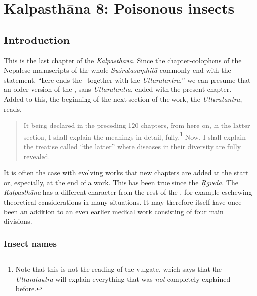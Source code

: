 \chapter{Kalpasthāna 8: Poisonous insects}

\section{Introduction} 

This is the last chapter of the \emph{Kalpasthāna}.  Since the
chapter-colophons of the Nepalese manuscripts of the whole
\emph{Suśrutasaṃhitā} commonly end with the statement, “here ends the
\SS\ together with the \emph{Uttaratantra},” we can presume that an older
version of the \SS, sans \emph{Uttaratantra}, ended with the present chapter.
Added to this, the beginning of the next section of the work, the
\emph{Uttaratantra}, reads,
\begin{quote}
It being declared in the preceding 120
chapters, from here on, in the latter section, I shall explain the
meanings in detail, fully.\footnote{Note that this is not the reading
    of the vulgate, which says that the \emph{Uttaratantra} will explain
    everything that was \emph{not} completely explained before.}  Now, I
    shall explain the treatise called “the latter” where diseases
    in their diversity are fully revealed.
    \end{quote}
It is often the case with evolving works that new chapters are added
at the start or, especially, at the end of a work.  This has been true
since the \emph{Ṛgveda}.  The \emph{Kalpasthāna} has a different character
from the rest of the \SS, for example eschewing theoretical
considerations in many situations.  It may therefore itself have once
been an addition to an even earlier medical work consisting of four main
divisions.

\subsection{Insect names}


